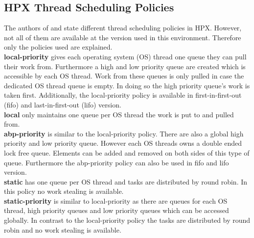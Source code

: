 \subsection{HPX Thread Scheduling Policies}
 The authors of \cite{hpxMP.2019} and \cite{TheSTEARGroup.2020} state different thread scheduling policies in HPX.
 However, not all of them are available at the version used in this environment.
 Therefore only the policies used are explained.\\
 \textbf{local-priority} gives each operating system (OS) thread one queue they can pull their work from.
 Furthermore a high and low priority queue are created which is accessible by each OS thread.
 Work from these queues is only pulled in case the dedicated OS thread queue is empty.
 In doing so the high priority queue's work is taken first.
 Additionally, the local-priority policy is available in first-in-first-out (fifo) and last-in-first-out (lifo) version.\\
 \textbf{local} only maintains one queue per OS thread the work is put to and pulled from.\\
 \textbf{abp-priority} is similar to the local-priority policy.
 There are also a global high priority and low priority queue.
 However each OS threads owns a double ended lock free queue.
 Elements can be added and removed on both sides of this type of queue.
 Furthermore the abp-priority policy can also be used in fifo and lifo version.\\
 \textbf{static} has one queue per OS thread and tasks are distributed by round robin.
 In this policy no work stealing is available.\\
 \textbf{static-priority} is similar to local-priority as there are queues for each OS thread, high priority queues and low priority queues which can be accessed globally.
 In contrast to the local-priority policy the tasks are distributed by round robin and no work stealing is available.

